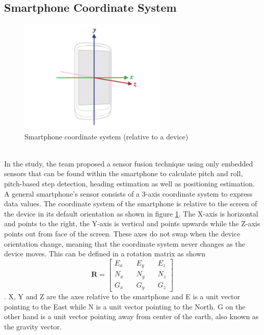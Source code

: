 \documentclass{l4proj}
\begin{document}
\subsection{Smartphone Coordinate System}
\begin{figure}[h]
    \centering
    \includegraphics[width=70mm]{images/smartphone}
    \caption{Smartphone coordinate system (relative to a device)}
    \label{fig:smartphone1}
\end{figure}\\
In the study, the team proposed a sensor fusion technique using only embedded sensors that can be found within the smartphone to calculate pitch and roll, pitch-based step detection, heading estimation as well as positioning estimation.\\
A general smartphone's sensor consists of a 3-axis coordinate system to express data values. The coordinate system of the smartphone is relative to the screen of the device in its default orientation as shown in figure \ref{fig:smartphone1}. The X-axis is horizontal and points to the right, the Y-axis is vertical and points upwards while the Z-axis points out from face of the screen. These axes do not swap when the device orientation change, meaning that the coordinate system never changes as the device moves. This can be defined in a rotation matrix as shown
\begin{equation*} \boldsymbol {R} = \left [{ {\begin{array}{*{20}{c}} {E_{x}}&\quad {E_{y}}&\quad {E_{z}}\\ {N_{x}}&\quad {N_{y}}&\quad {N_{z}}\\ {G_{x}}&\quad {G_{y}}&\quad {G_{z}} \end{array}} }\right]\tag{1}\end{equation*}. X, Y and Z are the axes relative to the smartphone and E is a unit vector pointing to the East while N is a unit vector pointing to the North. G on the other hand is a unit vector pointing away from center of the earth, also known as the gravity vector.\\
\end{document}
